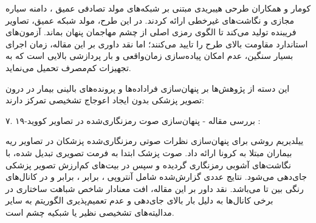 کومار و همکاران طرحی هیبریدی مبتنی بر شبکه‌های مولد تصادفی عمیق ، دامنه سیاره مجازی  و نگاشت‌های غیرخطی  ارائه کردند. در این طرح، مولد  شبکه عمیق، تصاویر فریبنده  تولید می‌کند تا الگوی رمزی اصلی از چشم مهاجمان پنهان بماند. آزمون‌های استاندارد  مقاومت بالای طرح را تایید می‌کنند؛ اما نقد داوری بر این مقاله، زمان اجرای بسیار سنگین، عدم امکان پیاده‌سازی زمان‌واقعی  و بار پردازشی بالایی است که به تجهیزات کم‌مصرف  تحمیل می‌نماید.\par






این دسته از پژوهش‌ها بر پنهان‌سازی فراداده‌ها و پرونده‌های بالینی بیمار در درون تصویر پزشکی بدون ایجاد اعوجاج تشخیصی تمرکز دارند:\par



۷. بررسی مقاله   {-} پنهان‌سازی صوت رمزنگاری‌شده در تصاویر  کووید{-}۱۹ :\par

ییلدیریم روشی برای پنهان‌سازی نظرات صوتی رمزنگاری‌شده پزشکان در تصاویر  ریه بیماران مبتلا به کرونا ارائه داد. صوت پزشک ابتدا به فرمت تصویری تبدیل شده، با نگاشت‌های آشوبی رمزنگاری گردیده و سپس در بیت‌های کم‌ارزش  تصویر پزشکی جای‌دهی می‌شود. نتایج عددی گزارش‌شده شامل آنتروپی ،  برابر ،  برابر  و  در کانال‌های رنگی بین  تا  می‌باشد. نقد داور بر این مقاله، افت معنادار شاخص شباهت ساختاری  در برخی کانال‌ها به دلیل بار بالای جای‌دهی و عدم تعمیم‌پذیری الگوریتم به سایر مدالیته‌های تشخیصی نظیر  یا شبکیه چشم است.\par



